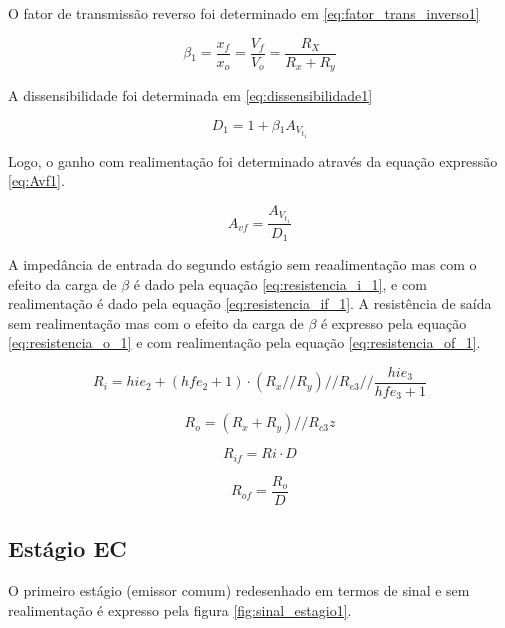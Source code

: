 \documentclass[openright]{normas-utf-tex} %
\begin{document}
O fator de transmissão reverso foi determinado em \ref{eq:fator_trans_inverso1}

\begin{equation}\label{eq:fator_trans_inverso1}
\beta{_1} = \frac{x_f}{x_o} = \frac{V_f}{V_o} = \frac{R_X}{R_x+R_y}
\end{equation}

A dissensibilidade foi determinada em \ref{eq:dissensibilidade1}

\begin{equation}\label{eq:dissensibilidade1}
D_1 = 1+ \beta{_1} A_{V_{t_1}}
\end{equation}

Logo, o ganho com realimentação foi determinado através da equação expressão \ref{eq:Avf1}.

\begin{equation}\label{eq:Avf1}
A_{vf} = \frac{A_{V_{t_1}}}{D_1}
\end{equation}


A impedância de entrada do segundo estágio sem reaalimentação mas com o efeito da carga de $\beta$ é dado pela equação \ref{eq:resistencia_i_1}, e com realimentação é dado pela equação \ref{eq:resistencia_if_1}. A resistência de saída sem realimentação mas com o efeito da carga de $\beta$ é expresso pela equação \ref{eq:resistencia_o_1} e com realimentação pela equação \ref{eq:resistencia_of_1}.

\begin{equation} \label{eq:resistencia_i_1}
R_i =hie_2+\left(hfe_2+1\right)\cdot\left(R_x//R_y\right)//R_{e3}//\frac{hie_3}{hfe_3+1}
\end{equation}



\begin{equation}\label{eq:resistencia_o_1}
R_o =\left(R_x+R_y\right)//R_{c3}
z\end{equation}



\begin{equation}\label{eq:resistencia_if_1}
R_{if} =Ri\cdot D
\end{equation}


\begin{equation}\label{eq:resistencia_of_1}
R_{of} = \frac{R_o}{D}
\end{equation}

\subsection{Estágio EC}
\label{subsec:stage1}
O primeiro estágio (emissor comum) redesenhado em termos de sinal e sem realimentação é expresso pela figura \ref{fig:sinal_estagio1}.
\end{document}
